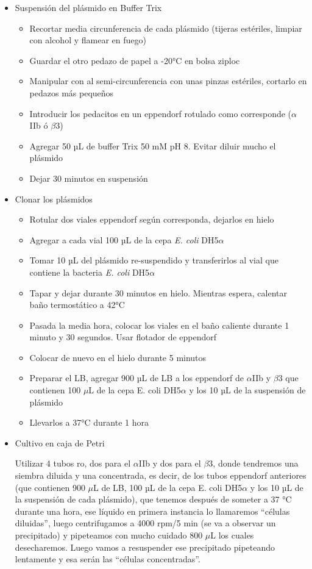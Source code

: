 \begin{appendix}
\begin{itemize}
     \item{Suspensión del plásmido en Buffer Trix}
      \begin{itemize}
        \item{Recortar media circunferencia de cada plásmido (tijeras estériles, limpiar con alcohol y flamear en fuego)}
        \item{Guardar el otro pedazo de papel a -20°C en bolsa ziploc}
        \item{Manipular con al semi-circunferencia con unas pinzas estériles, cortarlo en pedazos más pequeños}
        \item{Introducir los pedacitos en un eppendorf rotulado como corresponde ($\alpha$IIb ó $\beta$3)}
        \item{Agregar 50 µL de buffer Trix 50 mM pH 8. Evitar diluir mucho el plásmido}
        \item{Dejar 30 minutos en suspensión}
      \end{itemize}
    
    \item{Clonar los plásmidos}
      \begin{itemize}
        \item{Rotular dos viales eppendorf según corresponda, dejarlos en hielo}
        \item{Agregar a cada vial 100 µL de la cepa \emph{E. coli} DH5$\alpha$}
        \item{Tomar 10 µL del plásmido re-suspendido y transferirlos al vial que contiene la bacteria \emph{E. coli} DH5$\alpha$}
        \item{Tapar y dejar durante 30 minutos en hielo. Mientras espera, calentar baño termostático a 42°C}
        \item{Pasada la media hora, colocar los viales en el baño caliente durante 1 minuto y 30 segundos. Usar flotador de eppendorf}
        \item{Colocar de nuevo en el hielo durante 5 minutos}
        \item{Preparar el LB,  agregar 900 µL de LB a los eppendorf de $\alpha$IIb y $\beta$3 que contienen 100 $\mu$L de la cepa E. coli DH5$\alpha$ y los 10 µL de la suspensión de plásmido}
        \item{Llevarlos a 37°C durante 1 hora}
    \end{itemize}
    
    \item{Cultivo en caja de Petri}

     Utilizar 4 tubos ro, dos para el $\alpha$IIb y dos para el $\beta$3, donde tendremos una siembra diluida y una concentrada, es decir, de los tubos eppendorf anteriores (que contienen 900 $\mu$L de LB, 100 µL de la cepa E. coli DH5$\alpha$ y los 10 µL de la suspensión de cada plásmido), que tenemos después de someter a 37 °C durante una hora, ese líquido en primera instancia lo llamaremos “células diluidas”, luego centrifugamos a 4000 rpm/5 min (se va a observar un precipitado) y pipeteamos con mucho cuidado 800 $\mu$L los cuales desecharemos. Luego vamos a resuspender ese precipitado pipeteando lentamente y esa serán las “células concentradas”.


\end{itemize}
\end{appendix}
